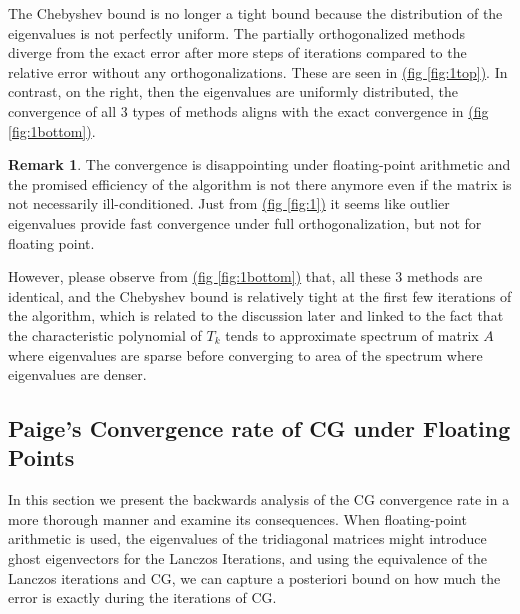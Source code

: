\documentclass[]{article}
\theoremstyle{definition}
\newtheorem{remark}{Remark}[subsection]  %
\begin{document}
        The Chebyshev bound is no longer a tight bound because the distribution of the eigenvalues is not perfectly uniform. The partially orthogonalized methods diverge from the exact error after more steps of iterations compared to the relative error without any orthogonalizations. These are seen in \hyperref[fig:1]{(fig \ref*{fig:1top})}. In contrast, on the right, then the eigenvalues are uniformly distributed, the convergence of all 3 types of methods aligns with the exact convergence in \hyperref[fig:1]{(fig \ref*{fig:1bottom})}. 
        \begin{remark}
            The convergence is disappointing under floating-point arithmetic and the promised efficiency of the algorithm is not there anymore even if the matrix is not necessarily ill-conditioned. Just from \hyperref[fig:1]{(fig \ref*{fig:1})} it seems like outlier eigenvalues provide fast convergence under full orthogonalization, but not for floating point. 
            \par
            However, please observe from \hyperref[fig:1]{(fig \ref*{fig:1bottom})} that, all these 3 methods are identical, and the Chebyshev bound is relatively tight at the first few iterations of the algorithm, which is related to the discussion later and linked to the fact that the characteristic polynomial of $T_k$ tends to approximate spectrum of matrix $A$ where eigenvalues are sparse before converging to area of the spectrum where eigenvalues are denser. 
        \end{remark}
    \subsection{Paige's Convergence rate of CG under Floating Points}
        In this section we present the backwards analysis of the CG convergence rate in a more thorough manner and examine its consequences. When floating-point arithmetic is used, the eigenvalues of the tridiagonal matrices might introduce ghost eigenvectors for the Lanczos Iterations, and using the equivalence of the Lanczos iterations and CG, we can capture a posteriori bound on how much the error is exactly during the iterations of CG. 
\end{document}
